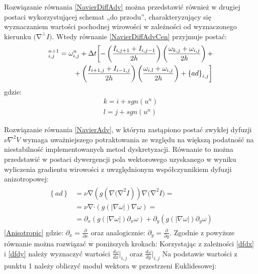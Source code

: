 \documentclass[12pt, twoside, openany]{report}
\theoremstyle{definition}
\begin{document}
Rozwiązanie równania \eqref{NavierDiffAdv} można przedstawić również w drugiej postaci wykorzystującej schemat „do przodu”, charakteryzujący się wyznaczaniem wartości pochodnej wirowości w zależności od wyznaczonego kierunku ${\mathrm{(}\mathrm{\nabla }}^{\bot }I)$.  Wtedy równanie \eqref{NavierDiffAdvCen} przyjmuje postać:
\begin{align}
\fontsize{11}
{\omega }^{n+1}_{i,j} &= {\omega }^n_{i,j}+\Delta t\biggl[
-\left(\frac{I_{i,j+1}+I_{i,j-1}}{2h}\right)\left(\frac{{\omega }_{k,j}+{\omega }_{i,j}}{2h}\right)+ \notag\\ 
&\qquad+ \left(\frac{I_{i+1,j}+I_{i-1,j}}{2h}\right)\left(\frac{{\omega }_{i,l}+{\omega }_{i,j}}{2h}\right)+{\left\{ad\right\}}_{i,j} \biggr]
\label{NavierDiffAdvFor}
\end{align}
gdzie:
\begin{align}
k = i+sgn\left(u^n\right) \\
l = j+sgn(u^n)
\end{align}
\par
Rozwiązanie równania \eqref{NavierAdv}, w którym zastąpiono postać zwykłej dyfuzji $\nu {\nabla }^2V$ wymaga uważniejszego potraktowania ze względu na większą podatność na niestabilność implementowanych metod dyskretyzacji. Równanie to można przedstawić w postaci dywergencji pola wektorowego uzyskanego w wyniku wyliczenia gradientu wirowości z uwzględnionym współczynnikiem dyfuzji anizotropowej:
\begin{align}
\begin{aligned}
\left\{ad\right\} 
&= \nu \mathrm{\nabla }(g(\nabla {\mathrm{(}\mathrm{\nabla }}^2I))\nabla {\mathrm{(}\mathrm{\nabla }}^2I)= \\[1ex]
&= \nu \mathrm{\nabla }\mathrm{\cdot}(g(|\nabla \omega |)\nabla \omega )=\\[1ex]
&= {\partial }_x\left(g\left(\left|\nabla \omega \right|\right){\partial }_x\omega \right)+{\partial }_y\left(g\left(\left|\nabla \omega \right|\right){\partial }_y\omega \right)
\end{aligned}
\label{Anisotropic}
\end{align}
\eqref{Anisotropic}
gdzie: ${\partial }_x=\frac{\partial }{\partial x}$ oraz analogicznie: ${\partial }_y=\frac{\partial }{\partial y}$.
Zgodnie z \cite{ebrahimi2012navier} powyższe równanie można rozwiązać w poniższych krokach:
Korzystając z zależności \eqref{dfdx} i \eqref{dfdy} należy wyznaczyć wartości ${\frac{d\omega }{dx}}\big|_{i,j}$ oraz ${\frac{d\omega }{dy}}\big|_{i,j}$
Na podstawie wartości z punktu 1 należy obliczyć moduł wektora w przestrzeni Euklidesowej:
\end{document}
